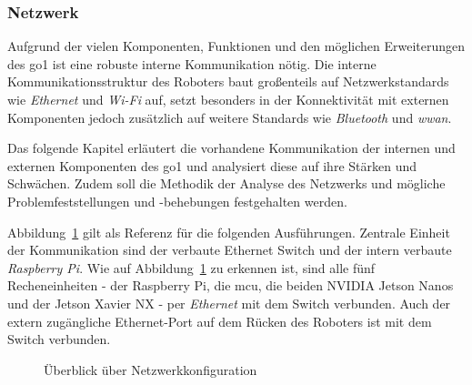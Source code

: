 \subsubsection{Netzwerk}
\label{subsubsec:netzwerk}

Aufgrund der vielen Komponenten, Funktionen und den möglichen Erweiterungen des \gls{go1} ist eine robuste interne Kommunikation nötig.
Die interne Kommunikationsstruktur des Roboters baut großenteils auf Netzwerkstandards wie \emph{Ethernet} und \emph{Wi-Fi} auf,
setzt besonders in der Konnektivität mit externen Komponenten jedoch zusätzlich auf weitere Standards wie \emph{Bluetooth} und \emph{\gls{wwan}}.

Das folgende Kapitel erläutert die vorhandene Kommunikation der internen und externen Komponenten des \gls{go1} und analysiert diese
auf ihre Stärken und Schwächen.
Zudem soll die Methodik der Analyse des Netzwerks und mögliche Problemfeststellungen und -behebungen festgehalten werden.

\label{par:netzwerk_ueberblick}

Abbildung~\ref{fig:netzwerk_ueberblick} gilt als Referenz für die folgenden Ausführungen.
Zentrale Einheit der Kommunikation sind der verbaute Ethernet Switch und
der intern verbaute \emph{Raspberry Pi}.
Wie auf Abbildung~\ref{fig:netzwerk_ueberblick} zu erkennen ist, sind alle fünf Recheneinheiten -
der Raspberry Pi, die \gls{mcu}, die beiden NVIDIA Jetson Nanos und der Jetson Xavier NX -
per \emph{Ethernet} mit dem Switch verbunden.
Auch der extern zugängliche Ethernet-Port auf dem Rücken des Roboters ist mit dem Switch verbunden.

\begin{figure}[h]
    \caption{Überblick über Netzwerkkonfiguration}\label{fig:netzwerk_ueberblick}
\end{figure}

